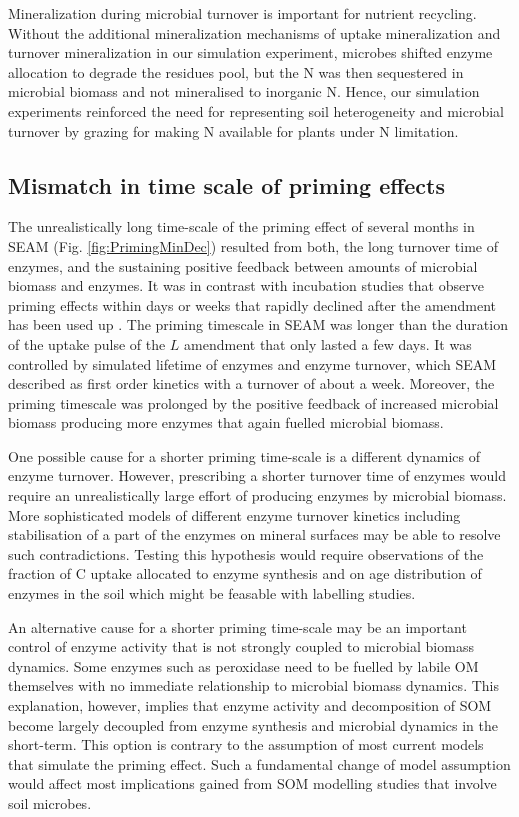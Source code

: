 Mineralization during microbial turnover is important for nutrient recycling.
Without the additional mineralization mechanisms of uptake mineralization
\citep{Manzoni08} and turnover mineralization \citep{Clarholm85, Raynaud06} in
our simulation experiment, microbes shifted enzyme allocation to degrade the
residues pool, but the N was then sequestered in microbial biomass and not
mineralised to inorganic N. Hence, our simulation experiments reinforced the
need for representing soil heterogeneity and microbial turnover by grazing
for making N available for plants under N limitation.

\subsection{Mismatch in time scale of priming effects}
The unrealistically long time-scale of the priming effect of several months in
SEAM (Fig. \ref{fig:PrimingMinDec}) resulted from both, the long turnover time of
enzymes, and the sustaining positive feedback between amounts of microbial
biomass and enzymes. It was in contrast with incubation studies that observe
priming effects within days or weeks that rapidly declined after the amendment
has been used up \citep{Blagodatskaya14}.
The priming timescale in SEAM was longer than the duration of the uptake pulse
of the $L$ amendment that only lasted a few days. It was controlled by simulated
lifetime of enzymes and enzyme turnover, which SEAM described as first order
kinetics with a turnover of about a week. Moreover, the priming timescale was
prolonged by the positive feedback of increased microbial biomass producing more
enzymes that again fuelled microbial biomass. 

One possible cause for a shorter priming time-scale is a different dynamics of
enzyme turnover. However, prescribing a shorter turnover time of enzymes would
require an unrealistically large effort of producing enzymes by microbial
biomass. More sophisticated models of different enzyme turnover kinetics
including stabilisation of a part of the enzymes on mineral surfaces
\citep{Burns13} may be able to resolve such contradictions. Testing this
hypothesis would require observations of the fraction of C uptake allocated to
enzyme synthesis and on age distribution of enzymes in the soil which might be
feasable with labelling studies.

An alternative cause for a shorter priming time-scale may be an important
control of enzyme activity that is not strongly coupled to microbial biomass
dynamics. Some enzymes such as peroxidase need to be fuelled by labile OM
themselves \citep{Rousk14} with no immediate relationship to microbial biomass
dynamics. This explanation, however, implies that enzyme activity and
decomposition of SOM become largely decoupled from enzyme synthesis and
microbial dynamics in the short-term. This option is contrary to the assumption
of most current models that simulate the priming effect. Such a fundamental
change of model assumption would affect most implications gained from
SOM modelling studies that involve soil microbes.

